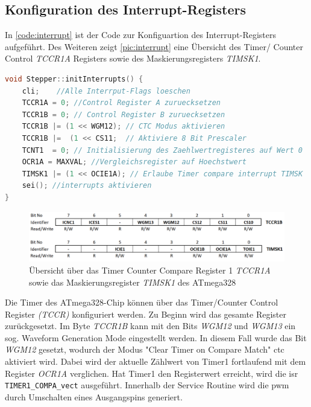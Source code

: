 \subsection{Konfiguration des Interrupt-Registers}
\label{sec:interrupt}

In \autoref{code:interrupt} ist der Code zur Konfiguartion des Interrupt-Registers aufgeführt. Des Weiteren zeigt \autoref{pic:interrupt} eine Übersicht des Timer/ Counter Control \textit{TCCR1A} Registers sowie des Maskierungsregisters \textit{TIMSK1}.

\begin{lstlisting}[language=c, style=dhpaperdefault]
void Stepper::initInterrupts() {
	cli;	//Alle Interrput-Flags loeschen
	TCCR1A = 0;	//Control Register A zuruecksetzen
	TCCR1B = 0;	// Control Register B zuruecksetzen
	TCCR1B |= (1 << WGM12); // CTC Modus aktivieren
	TCCR1B |=  (1 << CS11;	// Aktiviere 8 Bit Prescaler
	TCNT1  = 0;	// Initialisierung des Zaehlwertregisteres auf Wert 0
	OCR1A = MAXVAL;	//Vergleichsregister auf Hoechstwert
	TIMSK1 |= (1 << OCIE1A); // Erlaube Timer compare interrupt TIMSK 
	sei(); //interrupts aktivieren 
}
\end{lstlisting}

\begin{figure}[h]
	\begin{center}
		\includegraphics[width=\textwidth]{interrupts.png}
		\caption{\label{pic:interrupt}Übersicht über das Timer Counter Compare Register 1 \textit{TCCR1A} sowie das Maskierungsregister \textit{TIMSK1} des ATmega328}
	\end{center}
\end{figure}

Die Timer des ATmega328-Chip können über das Timer/Counter Control Register \textit{(TCCR)} konfiguriert werden. Zu Beginn wird das gesamte Register zurückgesetzt. Im Byte \textit{TCCR1B} kann mit den Bits \textit{WGM12} und \textit{WGM13} ein sog. Waveform Generation Mode eingestellt werden. In diesem Fall wurde das Bit \textit{WGM12} gesetzt, wodurch der Modus "Clear Timer on Compare Match" \acrshort{ctc} aktiviert wird. 
Dabei wird der aktuelle Zählwert von Timer1 fortlaufend mit dem Register \textit{OCR1A} verglichen. Hat Timer1 den Registerwert erreicht, wird die \acrshort{isr}  \texttt{TIMER1\_COMPA\_vect} ausgeführt. Innerhalb der Service Routine wird die \acrshort{pwm} durch Umschalten eines Ausgangspins generiert. \newpage

